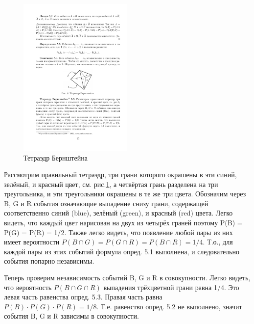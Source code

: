 \begin{figure}[H]
	\centering
	\includegraphics[width=0.5\textwidth]{pic/pic6.pdf}
	\caption{Тетраэдр Бернштейна}
	\label{pic:6}
\end{figure}
\begin{theorem}
	Рассмотрим правильный тетраэдр, три
грани которого окрашены в эти синий, зелёный, и красный цвет, см. рис.\ref{pic:6},
а четвёртая грань разделена на три треугольника, и эти треугольники окрашены в те же три цвета. Обозначим через B, G и R события означающие
выпадение снизу грани, содержащей соответственно синий (blue), зелёный
(green), и красный (red) цвета.
Легко видеть, что каждый цвет нарисован на двух из четырёх граней
поэтому P(B) = P(G) = P(R) = 1/2. Также легко видеть, что появление
любой пары из них имеет вероятности $P(B\cap G) = P(G\cap R) = P(B\cap R) = 1/4$.
Т.о., для каждой пары из этих событий формула опред. 5.1 выполнена, и
следовательно события попарно независимы.

Теперь проверим независимость событий B, G и R в совокупности. Легко
видеть, что вероятность $P(B \cap  G \cap  R)$ выпадения трёхцветной грани равна
1/4. Это левая часть равенства опред. 5.3. Правая часть равна $P(B) \cdot P(G) \cdot
P(R) = 1/8$. Т.е. равенство опред. 5.2 не выполнено, значит события B, G
и R зависимы в совокупности.

\end{theorem}

